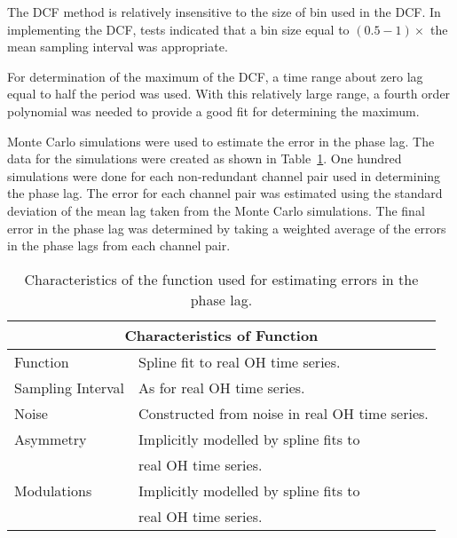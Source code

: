 \documentclass[usenatbib,usegraphicx]{mn2e}
\begin{document}
                  
The DCF method is relatively insensitive to the size of bin used in the DCF. 
In implementing the DCF, tests indicated that a bin size equal to 
$(0.5 - 1)\times$ the mean sampling interval was appropriate.

For determination of the maximum of the DCF, a time range about zero lag
equal to half the period was used.  With this relatively large range, a
fourth order polynomial was needed to provide a good fit for determining the
maximum.
 

Monte Carlo simulations were used to estimate the error in the phase lag.
The data for the simulations were created as shown in
Table~\ref{tbl:tstplerr}.  One hundred simulations were done for each
non-redundant channel pair used in determining the phase lag.  The error for
each channel pair was estimated using the standard deviation of the mean lag
taken from the Monte Carlo simulations.  The final error in the phase lag
was determined by taking a weighted average of the errors in the phase lags
from each channel pair.

\begin{table}

\caption{Characteristics of the function used for estimating errors in the
phase lag.}

\label{tbl:tstplerr}

\begin{tabular}{|l|l|}

\hline
\multicolumn{2}{c}{Characteristics of Function} \\

\hline

Function & Spline fit to real OH time series. \\
Sampling Interval & As for real OH time series. \\
Noise & Constructed from noise in real OH time series. \\
Asymmetry & Implicitly modelled by spline fits to\\
 & real OH time series. \\
Modulations & Implicitly modelled by spline fits to\\
 & real OH time series. \\

\hline

\end{tabular}
\end{table}
\end{document}
